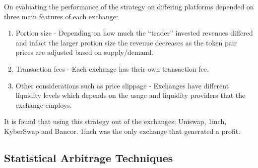 On evaluating the performance of the strategy on differing platforms depended on three main features of each exchange:
\begin{enumerate}
    \item Portion size - Depending on how much the ``trader'' invested revenues differed and infact the larger protion size the revenue decreases as the token pair prices are adjusted based on supply/demand.
    \item Transaction fees - Each exchange has their own transaction fee.
    \item Other considerations such as price slippage - Exchanges have different liquidity levels which depends on the usage and liquidity providers that the exchange employs.
\end{enumerate}

It is found that using this strategy out of the exchanges; Uniswap, 1inch, KyberSwap and Bancor. 1inch was the only exchange that generated a profit.

% 



\subsection{Statistical Arbitrage Techniques}

